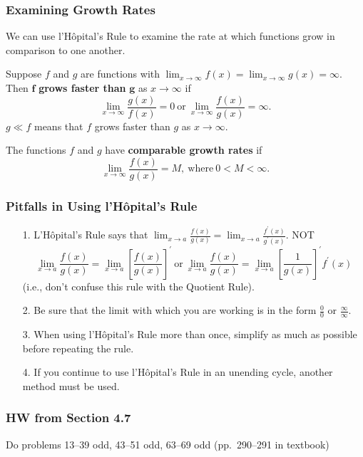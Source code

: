 \documentclass[14pt]{beamer}
\begin{document}
\begin{frame}
\frametitle{\small Examining Growth Rates}
\footnotesize
We can use l'H\^{o}pital's Rule to examine the rate at which functions grow in comparison to one another.
\begin{dfn} Suppose $f$ and $g$ are functions with $\displaystyle\lim_{x \to \infty} f(x) = \displaystyle\lim_{x \to \infty} g(x) = \infty$.  Then $\boldsymbol{f}$ {\bf grows faster than} $\boldsymbol{g}$ as $x \to \infty$ if 
$$\lim_{x \to \infty} \frac{g(x)}{f(x)} = 0\ \text{or}\ \lim_{x \to \infty} \frac{f(x)}{g(x)} = \infty.$$
$g \ll f$ means that $f$ grows faster than $g$ as $x \to \infty$.
\end{dfn}

\begin{dfn} The functions $f$ and $g$ have {\bf comparable growth rates} if 
$$\lim_{x \to \infty} \frac{f(x)}{g(x)}=M,\ \text{where}\ 0<M<\infty.$$
\end{dfn}
\end{frame}

\begin{frame}
\frametitle{\small Pitfalls in Using l'H\^{o}pital's Rule}
\footnotesize
\begin{itemize}
\item[1.] L'H\^{o}pital's Rule says that $\displaystyle\lim_{x \to a}\frac{f(x)}{g(x)} = 
\displaystyle\lim_{x \to a}\frac{f^{\prime}(x)}{g^{\prime}(x)}$.  \alert{NOT} 
\[\lim_{x \to a}\frac{f(x)}{g(x)} = \lim_{x \to a}\left[ \frac{f(x)}{g(x)} \right]^{\prime}\ \text{or}\
\lim_{x \to a}\frac{f(x)}{g(x)} = \lim_{x \to a} \left[ \frac{1}{g(x)} \right]^{\prime} f^{\prime}(x)\]
(i.e., don't confuse this rule with the Quotient Rule).
\item[2.] Be sure that the limit with which you are working is in the form $\frac{0}{0}$ or $\frac{\infty}{\infty}$.
\item[3.] When using l'H\^{o}pital's Rule more than once, simplify as much as possible before repeating the rule.
\item[4.] If you continue to use l'H\^{o}pital's Rule in an unending cycle, another method must be used.
\end{itemize}
\end{frame}

\begin{frame}
\frametitle{HW from Section 4.7}
Do problems 13--39 odd, 43--51 odd, 63--69 odd (pp.\ 290--291 in textbook)
\end{frame}
\end{document}
